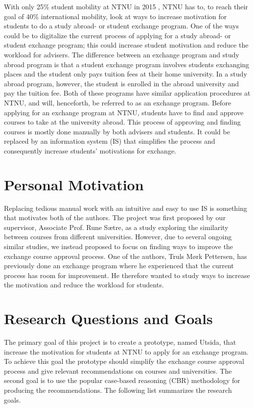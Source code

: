 With only 25\% student mobility at NTNU in 2015 \cite{studentutveksling_andel}, NTNU has to, to reach their goal of 40\% international mobility, look at ways to increase motivation for students to do a study abroad- or student exchange program. One of the ways could be to digitalize the current process of applying for a study abroad- or student exchange program; this could increase student motivation and reduce the workload for advisers. The difference between an exchange program and study abroad program is that a student exchange program involves students exchanging places and the student only pays tuition fees at their home university. In a study abroad program, however, the student is enrolled in the abroad university and pay the tuition fee. Both of these programs have similar application procedures at NTNU, and will, henceforth, be referred to as an exchange program. Before applying for an exchange program at NTNU, students have to find and approve courses to take at the university abroad. This process of approving and finding courses is mostly done manually by both advisers and students. It could be replaced by an information system (IS) that simplifies the process and consequently increase students' motivations for exchange. 

\section{Personal Motivation}
Replacing tedious manual work with an intuitive and easy to use IS is something that motivates both of the authors. The project was first proposed by our supervisor, Associate Prof. Rune Sætre, as a study exploring the similarity between courses from different universities. However, due to several ongoing similar studies, we instead proposed to focus on finding ways to improve the exchange course approval process. One of the authors, Truls Mørk Pettersen, has previously done an exchange program where he experienced that the current process has room for improvement. He therefore wanted to study ways to increase the motivation and reduce the workload for students.

\section{Research Questions and Goals}\label{RQ}
The primary goal of this project is to create a prototype, named Utsida, that increase the motivation for students at NTNU to apply for an exchange program. To achieve this goal the prototype should simplify the exchange course approval process and give relevant recommendations on courses and universities. The second goal is to use the popular case-based reasoning (CBR) methodology for producing the recommendations. The following list summarizes the research goals.

